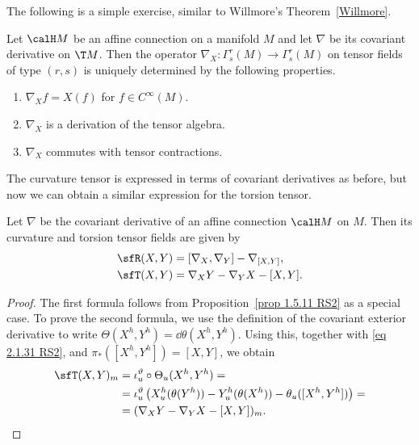 The following is a simple exercise, similar to Willmore's Theorem~\ref{Willmore}.
\begin{prop}[{{\cite[Prop.~2.1.18]{RS2}}}]\label{prop 2.1.18 RS2}
    Let $\calH M$ be an affine connection on a manifold $M$ and let $\nabla$ be its covariant derivative on $\T M$. Then the operator $\nabla_X:\Gamma^r_s(M)\to \Gamma^r_s(M)$ on tensor fields of type $(r,s)$ is uniquely determined by the following properties.
    \begin{enumerate}
        \item $\nabla_X f=X(f)$ for $f\in C^\infty(M)$.
        \item $\nabla_X$ is a derivation of the tensor algebra.
        \item $\nabla_X$ commutes with tensor contractions.
    \end{enumerate}
\end{prop}

The curvature tensor is expressed in terms of covariant derivatives as before, but now we can obtain a similar expression for the torsion tensor.

\begin{prop}[{{\cite[Prop.~2.1.19]{RS2}}}]\label{prop 2.1.19 RS2}
    Let $\nabla$ be the covariant derivative of an affine connection $\calH M$ on $M$. Then its curvature and torsion tensor fields are given by 
    \begin{align}
        \sfR(X,Y)&=[\nabla_X,\nabla_Y]-\nabla_{[X,Y]},\\
        \sfT(X,Y)&=\nabla_X Y-\nabla_Y X-[X,Y].\label{eq 2.1.33 RS2}
    \end{align}
\end{prop}
\begin{proof}
    The first formula follows from Proposition~\ref{prop 1.5.11 RS2} as a special case. To prove the second formula, we use the definition of the covariant exterior derivative to write $\Theta(X^h,Y^h)=\dd\theta(X^h,Y^h)$. Using this, together with \eqref{eq 2.1.31 RS2}, and $\pi_\ast([X^h,Y^h])=[X,Y]$, we obtain 
    \begin{align}
        \sfT(X,Y)_m&=\iota_u^\vartheta\circ \Theta_u(X^h,Y^h)=\notag\\
        &= \iota_u^\vartheta\left(X^h_u(\theta(Y^h))-Y^h_u(\theta(X^h))-\theta_u([X^h,Y^h])\right)=\notag\\
        &=(\nabla_X Y-\nabla_Y X-[X,Y])_m.
    \end{align}
\end{proof}


